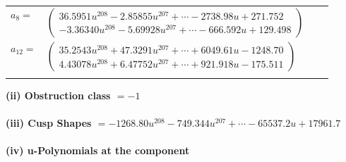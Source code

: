 \documentclass[1p]{elsarticle_modified}
\theoremstyle{definition}
\begin{document}
\begin{tabular}{m{7pt} m{180pt} m{7pt} m{180pt} }
\flushright $a_{8}=$&$\begin{pmatrix}36.5951 u^{208}-2.85855 u^{207}+\cdots-2738.98 u+271.752\\-3.36340 u^{208}-5.69928 u^{207}+\cdots-666.592 u+129.498\end{pmatrix}$ \\
\flushright $a_{12}=$&$\begin{pmatrix}35.2543 u^{208}+47.3291 u^{207}+\cdots+6049.61 u-1248.70\\4.43078 u^{208}+6.47752 u^{207}+\cdots+921.918 u-175.511\end{pmatrix}$\\&\end{tabular}
\flushleft \textbf{(ii) Obstruction class $= -1$}\\~\\
\flushleft \textbf{(iii) Cusp Shapes $= -1268.80 u^{208}-749.344 u^{207}+\cdots-65537.2 u+17961.7$}\\~\\
\newpage\renewcommand{\arraystretch}{1}
\flushleft \textbf{(iv) u-Polynomials at the component}\newline \\
\end{document}
